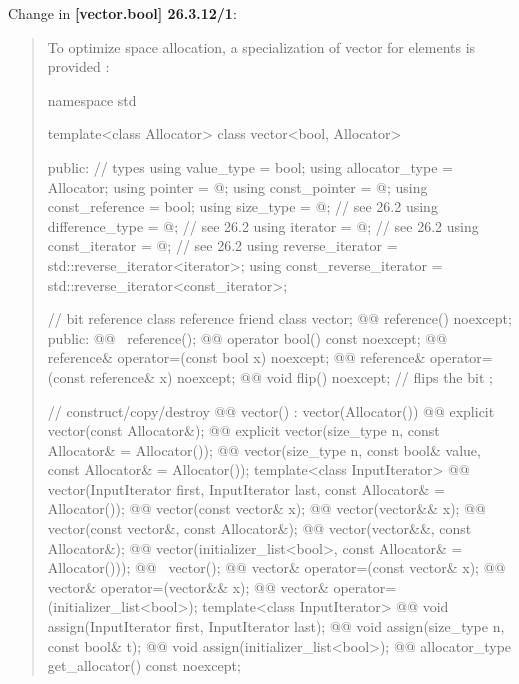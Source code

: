 \documentclass{wg21}
\begin{document}
Change in \textbf{[vector.bool] 26.3.12/1}:
\begin{quote}
To optimize space allocation, a specialization of vector for 
elements is provided :

\begin{codeblock}
namespace std {
  template<class Allocator>
  class vector<bool, Allocator> {
  public:
    // types
    using value_type             = bool;
    using allocator_type         = Allocator;
    using pointer                = @\impdef@;
    using const_pointer          = @\impdef@;
    using const_reference        = bool;
    using size_type              = @\impdef@; // see 26.2
    using difference_type        = @\impdef@; // see 26.2
    using iterator               = @\impdef@; // see 26.2
    using const_iterator         = @\impdef@; // see 26.2
    using reverse_iterator       = std::reverse_iterator<iterator>;
    using const_reverse_iterator = std::reverse_iterator<const_iterator>;

    // bit reference
    class reference {
      friend class vector;
      @@ reference() noexcept;
    public:
      @@ ~reference();
      @@ operator bool() const noexcept;
      @@ reference& operator=(const bool x) noexcept;
      @@ reference& operator=(const reference& x) noexcept;
      @@ void flip() noexcept;     // flips the bit
    };

    // construct/copy/destroy
    @@ vector() : vector(Allocator()) { }
    @@ explicit vector(const Allocator&);
    @@ explicit vector(size_type n, const Allocator& = Allocator());
    @@ vector(size_type n, const bool& value, const Allocator& = Allocator());
    template<class InputIterator>
      @@ vector(InputIterator first, InputIterator last, const Allocator& = Allocator());
    @@ vector(const vector& x);
    @@ vector(vector&& x);
    @@ vector(const vector&, const Allocator&);
    @@ vector(vector&&, const Allocator&);
    @@ vector(initializer_list<bool>, const Allocator& = Allocator()));
    @@ ~vector();
    @@ vector& operator=(const vector& x);
    @@ vector& operator=(vector&& x);
    @@ vector& operator=(initializer_list<bool>);
    template<class InputIterator>
      @@ void assign(InputIterator first, InputIterator last);
    @@ void assign(size_type n, const bool& t);
    @@ void assign(initializer_list<bool>);
    @@ allocator_type get_allocator() const noexcept;

}}
\end{codeblock}
\end{quote}
\end{document}
